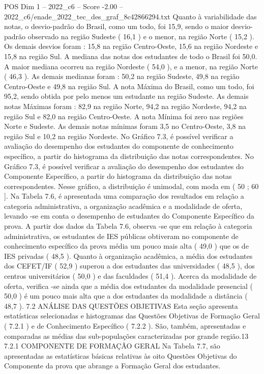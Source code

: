 \begin{textsample}{POS Dim 1 – 2022\_c6 – Score -2.00 – 2022\_c6/enade\_2022\_tec\_des\_graf\_8c42866294.txt}
Quanto à variabilidade das notas, o desvio-padrão do Brasil, como um todo, foi 15,9, sendo o maior desvio-padrão observado na região Sudeste ( 16,1 ) e o menor, na região Norte ( 15,2 ).
Os demais desvios foram : 15,8 na região Centro-Oeste, 15,6 na região Nordeste e 15,8 na região Sul.
A mediana das notas dos estudantes de todo o Brasil foi 50,0.
A maior mediana ocorreu na região Nordeste ( 54,0 ), e a menor, na região Norte ( 46,3 ).
As demais medianas foram : 50,2 na região Sudeste, 49,8 na região Centro-Oeste e 49,8 na região Sul.
A nota Máxima do Brasil, como um todo, foi 95,2, sendo obtida por pelo menos um estudante na região Sudeste.
As demais notas Máximas foram : 82,9 na região Norte, 94,2 na região Nordeste, 94,2 na região Sul e 82,0 na região Centro-Oeste.
A nota Mínima foi zero nas regiões Norte e Sudeste.
As demais notas mínimas foram 3,5 no Centro-Oeste, 3,8 na região Sul e 10,2 na região Nordeste.
No Gráfico 7.3, é possível verificar a avaliação do desempenho dos estudantes do componente de conhecimento específico, a partir do histograma da distribuição das notas correspondentes.
No Gráfico 7.3, é possível verificar a avaliação do desempenho dos estudantes do Componente Específico, a partir do histograma da distribuição das notas correspondentes.
Nesse gráfico, a distribuição é unimodal, com moda em ( 50 ; 60 ].
Na Tabela 7.6, é apresentada uma comparação dos resultados em relação a categoria administrativa, a organização acadêmica e a modalidade de oferta, levando -se em conta o desempenho de estudantes do Componente Específico da prova.
A partir dos dados da Tabela 7.6, observa -se que em relação à categoria administrativa, os estudantes de IES públicas obtiveram no componente de conhecimento específico da prova média um pouco mais alta ( 49,0 ) que os de IES privadas ( 48,5 ).
Quanto à organização acadêmica, a média dos estudantes dos CEFET/IF ( 52,9 ) superou a dos estudantes das universidades ( 48,5 ), dos centros universitários ( 50,0 ) e das faculdades ( 51,4 ).
Acerca da modalidade de oferta, verifica -se ainda que a média dos estudantes da modalidade presencial ( 50,0 ) é um pouco mais alta que a dos estudantes da modalidade a distância ( 48,7 ). 7.2 ANÁLISE DAS QUESTÕES OBJETIVAS Esta seção apresenta estatísticas selecionadas e histogramas das Questões Objetivas de Formação Geral ( 7.2.1 ) e de Conhecimento Específico ( 7.2.2 ).
São, também, apresentadas e comparadas as médias das sub-populações caracterizadas por grande região.13 7.2.1 COMPONENTE DE FORMAÇÃO GERAL Na Tabela 7.7, são apresentadas as estatísticas básicas relativas às oito Questões Objetivas do Componente da prova que abrange a Formação Geral dos estudantes.

\end{textsample}
